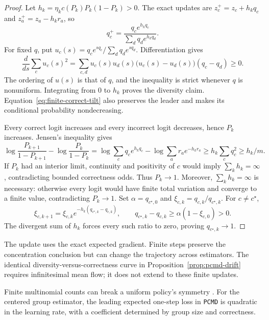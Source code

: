 \documentclass{article}
\newcommand{\enforcehalffinalproseline}{%
  \setlength{\parfillskip}{0pt plus .20\linewidth}}
\newcommand{\1}{\mathbf 1}
\newcommand{\pmd}{\texttt{PCMD}}
\theoremstyle{remark}
\theoremstyle{definition}
\theoremstyle{plain}
\begin{document}
\begin{proof}
\enforcehalffinalproseline
Let $h_k=\eta_kc(P_k)P_k(1-P_k)>0$. The exact updates are
$z_c^+=z_c+h_kq_c$ and $z_a^+=z_a-h_kr_a$, so
\begin{equation}
 q_c^+=\frac{q_c e^{h_kq_c}}{\sum_dq_d e^{h_kq_d}}.
 \label{eq:finite-correct-tilt}
\end{equation}
For fixed $q$, put $u_c(s)=q_ce^{sq_c}/\sum_dq_de^{sq_d}$.
Differentiation gives
\[
 \frac{d}{ds}\sum_cu_c(s)^2
 =\sum_{c,d}u_c(s)u_d(s)
       \big(u_c(s)-u_d(s)\big)(q_c-q_d)\ge0.
\]
The ordering of $u(s)$ is that of $q$, and the inequality is strict whenever
$q$ is nonuniform. Integrating from $0$ to $h_k$ proves the diversity claim.
Equation~\eqref{eq:finite-correct-tilt} also preserves the leader and makes
its conditional probability nondecreasing.

Every correct logit increases and every incorrect logit decreases, hence
$P_k$ increases. Jensen's inequality gives
\[
 \log\frac{P_{k+1}}{1-P_{k+1}}-\log\frac{P_k}{1-P_k}
 =\log\sum_cq_c e^{h_kq_c}-\log\sum_ar_a e^{-h_kr_a}
 \ge h_k\sum_cq_c^2\ge h_k/m.
\]
If $P_k$ had an interior limit, continuity and positivity of $c$ would imply
$\sum_kh_k=\infty$, contradicting bounded correctness odds. Thus $P_k\to1$.
Moreover, $\sum_kh_k=\infty$ is necessary: otherwise every logit would have
finite total variation and converge to a finite value, contradicting
$P_k\to1$.
Set $\alpha=q_{c^\star,0}$ and
$\xi_{c,k}=q_{c,k}/q_{c^\star,k}$. For $c\ne c^\star$,
\[
 \xi_{c,k+1}=\xi_{c,k}
  e^{-h_k(q_{c^\star,k}-q_{c,k})},
 \qquad
 q_{c^\star,k}-q_{c,k}
 \ge\alpha(1-\xi_{c,0})>0.
\]
The divergent sum of $h_k$ forces every such ratio to zero, proving
$q_{c^\star,k}\to1$.
\end{proof}

The update uses the exact expected gradient. Finite steps preserve the
concentration conclusion but can change the trajectory across estimators.
The identical diversity-versus-correctness curve in
Proposition~\ref{prop:pcmd-drift} requires infinitesimal mean flow;
it does not extend to these finite updates.

Finite multinomial counts can break a uniform policy's symmetry
\citep[Proposition~A.1]{lochab2026ucpo}. For the centered group estimator,
the leading expected one-step loss in \pmd{} is quadratic in the learning
rate, with a coefficient determined by group size and correctness.
\end{document}
